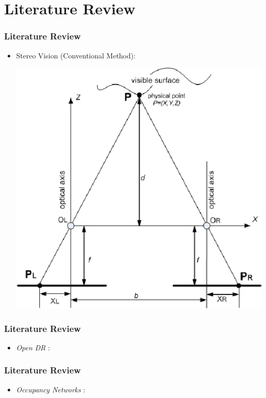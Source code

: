\documentclass{beamer}
\begin{document}
	\section{Literature Review}
	\begin{frame}
	\frametitle{Literature Review}
	\begin{itemize}
		
		\item Stereo Vision (Conventional Method): \\
		\begin{center}
			\includegraphics[height=0.5\textheight]{imgs/stereo.png}
		\end{center}
	\end{itemize}
	\end{frame}
	
	\begin{frame}
	\frametitle{Literature Review}
	\begin{itemize}
	
	\item \textit{Open DR} : 
	
	\end{itemize}
	\end{frame}
	
	\begin{frame}
	\frametitle{Literature Review}
	\begin{itemize}
	
	\item \textit{Occupancy Networks} :
	\end{itemize}
	\end{frame}
	
\end{document}
